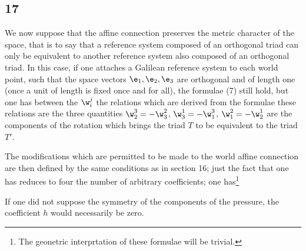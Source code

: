 \subsection*{17}
We now suppose that the affine connection preserves the metric character of the space, that is to say that a reference system composed of an orthogonal triad can only be equivalent to another reference system also composed of an orthogonal triad. In this case, if one attaches a Galilean reference system to each world point, such that the space vectors $\e_1, \e_2, \e_3$ are orthogonal and of length one (once a unit of length is fixed once and for all), the formulae (7) still hold, but one has between the $\w^j_i$ the relations which are derived from the formulae
these relations are
the three quantities $\w^3_2 = -\w^2_3$, $\w^1_3 = -\w^3_1$, $\w^2_1 = -\w^1_2$ are the components of the rotation which brings the triad $T$ to be equivalent to the triad $T'$.

The modifications which are permitted to be made to the world affine connection are then defined by the same conditions as in section 16; just the fact that one has
reduces to four the number of arbitrary coefficients; one has\footnote{The geonetric interprtation of these formulae will be trivial.}

If one did not suppose the symmetry of the components of the pressure, the coefficient $h$ would necessarily be zero.

